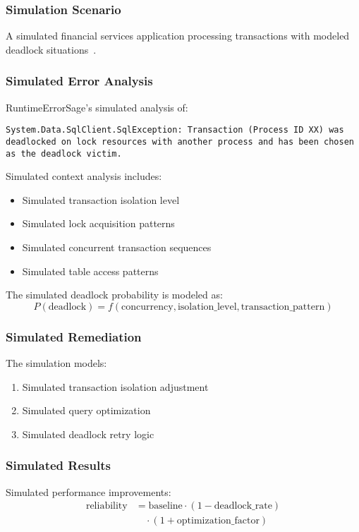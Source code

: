 \subsubsection{Simulation Scenario}
A simulated financial services application processing transactions with modeled deadlock situations~\cite{transaction_management_2024}.

\subsubsection{Simulated Error Analysis}
RuntimeErrorSage's simulated analysis of:
\begin{lstlisting}[style=csharpstyle,caption={Simulated Database Deadlock Error}]
System.Data.SqlClient.SqlException: Transaction (Process ID XX) was deadlocked on lock resources with another process and has been chosen as the deadlock victim.
\end{lstlisting}

Simulated context analysis includes:
\begin{itemize}
    \item Simulated transaction isolation level
    \item Simulated lock acquisition patterns
    \item Simulated concurrent transaction sequences
    \item Simulated table access patterns
\end{itemize}

The simulated deadlock probability is modeled as:
\begin{equation}
P(\text{deadlock}) = f(\text{concurrency}, \text{isolation\_level}, \text{transaction\_pattern})
\end{equation}

\subsubsection{Simulated Remediation}
The simulation models:
\begin{enumerate}
    \item Simulated transaction isolation adjustment
    \item Simulated query optimization
    \item Simulated deadlock retry logic
\end{enumerate}

\subsubsection{Simulated Results}
Simulated performance improvements:
\begin{equation}
\begin{split}
\text{reliability} &= \text{baseline} \cdot (1 - \text{deadlock\_rate}) \\
&\quad \cdot (1 + \text{optimization\_factor})
\end{split}
\end{equation}

